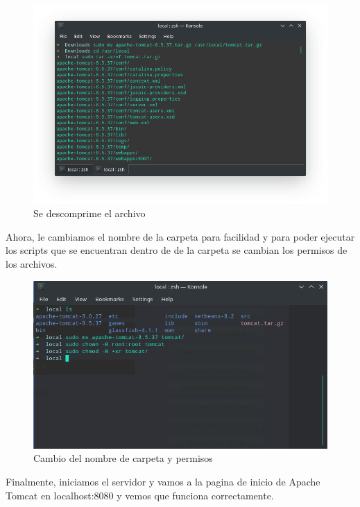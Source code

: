 \documentclass[a4paper,12pt]{article}
\begin{document}
\begin{figure}[H]
\begin{center}
 \includegraphics[width=12cm]{mover.png}
 \caption{Se descomprime el archivo}
 \label{fig:descomprimido}
\end{center}
\end{figure}

Ahora, le cambiamos el nombre de la carpeta para facilidad y para poder 
ejecutar los scripts que se encuentran dentro de de la carpeta se cambian los 
permisos de los archivos.

\begin{figure}[H]
\begin{center}
 \includegraphics[width=12cm]{permisos.png}
 \caption{Cambio del nombre de carpeta y permisos}
 \label{fig:permisos}
\end{center}
\end{figure}

Finalmente, iniciamos el servidor y vamos a la pagina de inicio de Apache 
Tomcat en localhost:8080 y vemos que funciona correctamente.
\end{document}
